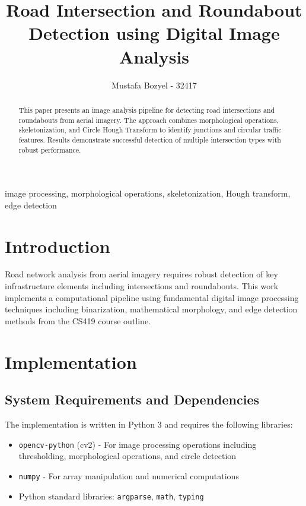 \documentclass[conference]{IEEEtran}
\begin{document}
\title{Road Intersection and Roundabout Detection using Digital Image Analysis}

\author{Mustafa Bozyel - 32417}

\maketitle

\begin{abstract}
This paper presents an image analysis pipeline for detecting road intersections and roundabouts from aerial imagery. The approach combines morphological operations, skeletonization, and Circle Hough Transform to identify junctions and circular traffic features. Results demonstrate successful detection of multiple intersection types with robust performance.
\end{abstract}

\begin{IEEEkeywords}
image processing, morphological operations, skeletonization, Hough transform, edge detection
\end{IEEEkeywords}

\section{Introduction}

Road network analysis from aerial imagery requires robust detection of key infrastructure elements including intersections and roundabouts. This work implements a computational pipeline using fundamental digital image processing techniques including binarization, mathematical morphology, and edge detection methods from the CS419 course outline.

\section{Implementation}

\subsection{System Requirements and Dependencies}

The implementation is written in Python 3 and requires the following libraries:

\begin{itemize}
    \item \texttt{opencv-python} (cv2) - For image processing operations including thresholding, morphological operations, and circle detection
    \item \texttt{numpy} - For array manipulation and numerical computations
    \item Python standard libraries: \texttt{argparse}, \texttt{math}, \texttt{typing}
\end{itemize}
\end{document}
